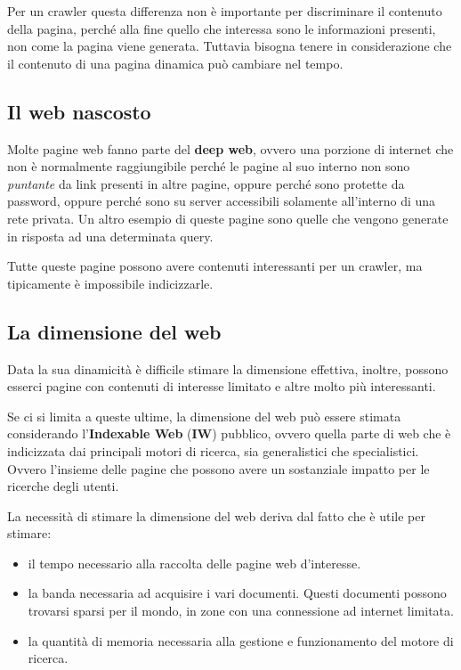 Per un crawler questa differenza non è importante per discriminare il contenuto della pagina, perché alla fine quello che interessa sono le informazioni presenti, non come la pagina viene generata.
Tuttavia bisogna tenere in considerazione che il contenuto di una pagina dinamica può cambiare nel tempo.

\subsection{Il web nascosto}

Molte pagine web fanno parte del \textbf{deep web}, ovvero una porzione di internet che non è normalmente raggiungibile perché le pagine al suo interno non sono \textit{puntante} da link presenti in altre pagine, oppure perché sono protette da password, oppure perché sono su server accessibili solamente all'interno di una rete privata. Un altro esempio di queste pagine sono quelle che vengono generate in risposta ad una determinata query.

Tutte queste pagine possono avere contenuti interessanti per un crawler, ma tipicamente è impossibile indicizzarle.

\subsection{La dimensione del web}

Data la sua dinamicità è difficile stimare la dimensione effettiva, inoltre, possono esserci pagine con contenuti di interesse limitato e altre molto più interessanti.

Se ci si limita a queste ultime, la dimensione del web può essere stimata considerando l'\textbf{Indexable Web} (\textbf{IW}) pubblico, ovvero quella parte di web che è indicizzata dai principali motori di ricerca, sia generalistici che specialistici. Ovvero l'insieme delle pagine che possono avere un sostanziale impatto per le ricerche degli utenti. 

La necessità di stimare la dimensione del web deriva dal fatto che è utile per stimare:

\begin{itemize}
	\item il tempo necessario alla raccolta delle pagine web d'interesse.
	\item la banda necessaria ad acquisire i vari documenti. Questi documenti possono trovarsi sparsi per il mondo, in zone con una connessione ad internet limitata.
	\item la quantità di memoria necessaria alla gestione e funzionamento del motore di ricerca.
\end{itemize}





















